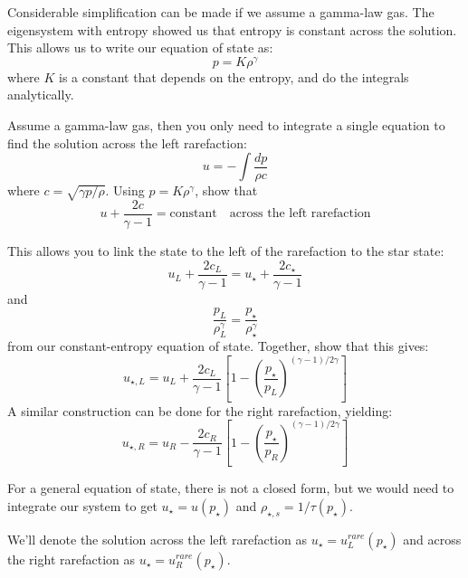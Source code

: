 Considerable simplification can be made if we assume a gamma-law gas.
The eigensystem with entropy showed us that entropy is constant across
the solution.  This allows us to write our equation of state as:
\begin{equation}
p = K \rho^\gamma
\end{equation}
where $K$ is a constant that depends on the entropy, and do the
integrals analytically.

\begin{exercise}
Assume a gamma-law gas, then you only need to integrate a single
equation to find the solution across the left rarefaction:
\begin{equation}
u = - \int \frac{dp}{\rho c}
\end{equation}
where $c = \sqrt{\gamma p/\rho}$.  Using $p = K\rho^\gamma$, show that
\begin{equation}
u + \frac{2c}{\gamma - 1} = \mbox{constant} \quad \mbox{across the left rarefaction}
\end{equation}

This allows you to link the state to the left of the rarefaction to the star state:
\begin{equation}
u_L + \frac{2c_L}{\gamma - 1} = u_\star + \frac{2c_\star}{\gamma -1}
\end{equation}
and
\begin{equation}
\frac{p_L}{\rho_L^\gamma} = \frac{p_\star}{\rho_\star^\gamma}
\end{equation}
from our constant-entropy equation of state.  Together, show that this
gives:
\begin{equation}
u_{\star,L} = u_L + \frac{2c_L}{\gamma - 1} \left [ 1 - \left ( \frac{p_\star}{p_L}\right )^{(\gamma - 1)/2\gamma} \right ]
\end{equation}
A similar construction can be done for the right rarefaction, yielding:
\begin{equation}
u_{\star,R} = u_R - \frac{2c_R}{\gamma - 1} \left [ 1 - \left ( \frac{p_\star}{p_R}\right )^{(\gamma - 1)/2\gamma} \right ]
\end{equation}

\end{exercise}

For a general equation of state, there is not a closed form, but we would need
to integrate our system to get $u_\star = u(p_\star)$ and $\rho_{\star,s} = 1/\tau(p_\star)$.

We'll denote the solution across the left rarefaction as $u_\star =
u_L^{rare}(p_\star)$ and across the right rarefaction as $u_\star =
u_R^{rare}(p_\star)$.

